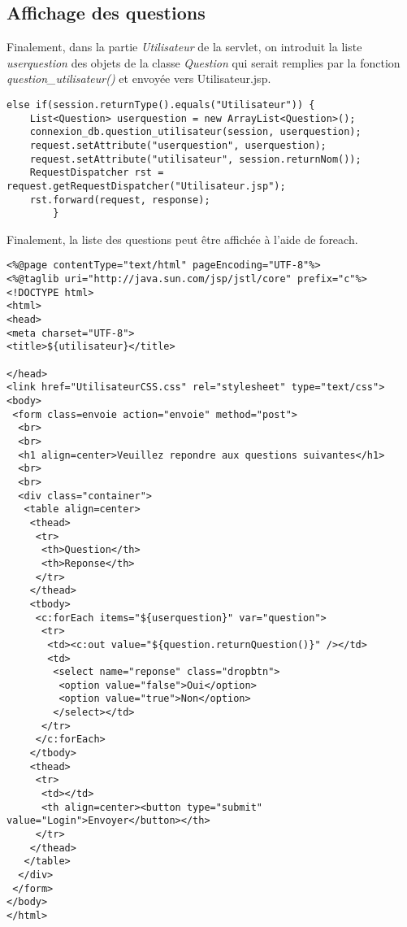 \documentclass[12]{article}
\begin{document}
\subsection{Affichage des questions}

Finalement, dans la partie \emph{Utilisateur} de la servlet, on introduit la liste \textit{userquestion} des objets de la classe \textit{Question} qui serait remplies par la fonction \textit{question\_utilisateur()} et envoyée vers Utilisateur.jsp.


\begin{scriptsize}
\lstset{language=java}
\begin{lstlisting}
else if(session.returnType().equals("Utilisateur")) {
	List<Question> userquestion = new ArrayList<Question>();
	connexion_db.question_utilisateur(session, userquestion);
	request.setAttribute("userquestion", userquestion);
	request.setAttribute("utilisateur", session.returnNom());
	RequestDispatcher rst = request.getRequestDispatcher("Utilisateur.jsp");
	rst.forward(request, response);
		}
\end{lstlisting}

\end{scriptsize}


Finalement, la liste des questions peut être affichée à l'aide de foreach.\\

\begin{scriptsize}
\lstset{language=XML}
\begin{lstlisting}
<%@page contentType="text/html" pageEncoding="UTF-8"%>
<%@taglib uri="http://java.sun.com/jsp/jstl/core" prefix="c"%>
<!DOCTYPE html>
<html>
<head>
<meta charset="UTF-8">
<title>${utilisateur}</title>

</head>
<link href="UtilisateurCSS.css" rel="stylesheet" type="text/css">
<body>
 <form class=envoie action="envoie" method="post">
  <br>
  <br>
  <h1 align=center>Veuillez repondre aux questions suivantes</h1>
  <br>
  <br>
  <div class="container">
   <table align=center>
    <thead>
     <tr>
      <th>Question</th>
      <th>Reponse</th>
     </tr>
    </thead>
    <tbody>
     <c:forEach items="${userquestion}" var="question">
      <tr>
       <td><c:out value="${question.returnQuestion()}" /></td>
       <td>
        <select name="reponse" class="dropbtn">
         <option value="false">Oui</option>
         <option value="true">Non</option>
        </select></td>
      </tr>
     </c:forEach>
    </tbody>
    <thead>
     <tr>
      <td></td>
      <th align=center><button type="submit" value="Login">Envoyer</button></th>
     </tr>
    </thead>
   </table>
  </div>
 </form>
</body>
</html>
\end{lstlisting}

\end{scriptsize}
\end{document}
